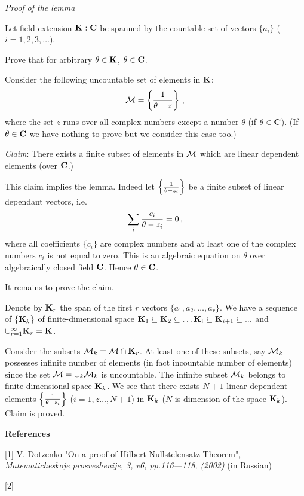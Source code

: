   \m

  {\it Proof of the lemma}

   Let field extension ${\bf K}:{\bf C}$ be spanned by the countable set of vectors $\{a_i\}$ ($i=1,2,3,\dots$).

   Prove that for arbitrary $\theta\in {\bf K}$,   $\theta\in {\bf C}$.

 Consider the following uncountable set of elements in ${\bf K}$:
                $$
             {\cal M}=\left\{{1\over \theta-z}\right\}\,,
                $$
      where the set $z$ runs over all complex numbers except a number $\theta$ (if $\theta\in {\bf C}$).
       (If $\theta\in {\bf C}$ we have nothing to prove but we consider this case too.)

\m

    {\it Claim}: There exists a finite subset of elements in ${\cal M}$
    which are linear dependent elements (over ${\bf C}$.)

\m

  This claim implies the lemma. Indeed let $\left\{{1\over \theta-z_i}\right\}$ be a  finite subset 
  of linear dependant vectors, i.e.
                       $$
           \sum_i {c_i\over \theta-z_i}=0\,,
                             $$
            where all coefficients $\{c_i\}$ are complex numbers 
            and at least one of the complex numbers $c_i$ is not equal to zero.
  This is an algebraic equation on $\theta$ over algebraically closed field ${\bf C}$.
 Hence $\theta\in {\bf C}$.

\smallskip

                It remains to prove the claim.

                \m

   Denote by ${\bf K}_r$ the span of the first $r$ vectors $\{a_1,a_2,\dots, a_r\}$.
   We have a sequence of $\{{\bf K}_k\}$ of finite-dimensional space ${\bf K}_1\subseteq {\bf K}_2\subseteq\dots {\bf K}_i\subseteq {\bf K}_{i+1}\subseteq ...$ and
$\cup_{r=1}^\infty {\bf K}_r={\bf K}$.

         Consider the subsets ${\cal M}_k={\cal M} \cap {\bf K}_r$.
        At least one of these subsets, say ${\cal M}_k$ possesses infinite number of elements 
        (in fact incountable number of elements)
        since the set ${\cal M}=\cup_k {\cal M}_k$ is uncountable. The infinite subset ${\cal M}_k$ belongs to 
        finite-dimensional space ${\bf K}_k$.
         We see that there exists
    $N+1$ linear dependent elements $\left\{{1\over \theta-z_i}\right\}$ ($i=1,z\dots,N+1$)
    in ${\bf K}_k$ ($N$ is dimension of the space ${\bf K}_k$). Claim is proved.





\centerline{\bf References}


[1] V. Dotzenko  "On a proof of Hilbert Nullstelensatz Theorem",
 {\it Matematicheskoje prosveshenije, 3, v6, pp.116---118, (2002)} (in Russian)

[2] 

\bye
